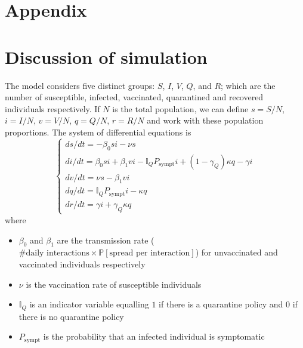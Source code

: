 \documentclass[12pt,a4paper]{article}
\begin{document}

\begin{appendices}

\newpage
\section*{Appendix}
\section{Discussion of simulation}\label{appendixA}

The model considers five distinct groups: $S$, $I$, $V$, $Q$, and $R$; which are the number of susceptible, infected, vaccinated, quarantined and recovered individuals respectively. If $N$ is the total population, we can define $s=S/N$, $i=I/N$, $v=V/N$, $q=Q/N$, $r=R/N$ and work with these population proportions. The system of differential equations is
\begin{equation}
	\begin{cases}
	ds/dt = -\beta_0si-\nu s\\
	di/dt = \beta_0si + \beta_1 vi - \mathbb{I}_QP_\text{sympt}i+(1-\gamma_Q)\kappa q - \gamma i\\
	dv/dt = \nu s - \beta_1	vi\\
	dq/dt = \mathbb{I}_QP_\text{sympt}i - \kappa q\\
	dr/dt = \gamma i +\gamma_Q\kappa q
	\end{cases}
\end{equation}
where 
\vspace*{-3mm}
\begin{itemize}
	\item $\beta_0$ and $\beta_1$ are the transmission rate ($\text{\# daily interactions}\times\mathbb{P}[\text{spread per interaction}]$) for unvaccinated and vaccinated individuals respectively
	\vspace*{-3mm}
	\item $\nu$ is the vaccination rate of susceptible individuals
	\vspace*{-3mm}
	\item $\mathbb{I}_Q$ is an indicator variable equalling $1$ if there is a quarantine policy and $0$ if there is no quarantine policy
	\vspace*{-3mm}
	\item $P_\text{sympt}$ is the probability that an infected individual is symptomatic

\end{itemize}
\end{appendices}
\end{document}

